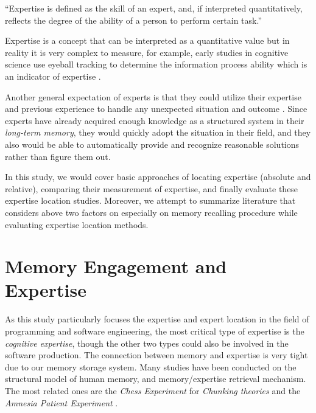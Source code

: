 \begin{displayquote}
``Expertise is defined as the skill of an expert, and, if interpreted quantitatively, reflects the degree of the ability of a person to perform certain task.''
\end{displayquote}

Expertise is a concept that can be interpreted as a quantitative value but in reality it is very complex to measure, for example, early studies in cognitive science use eyeball tracking to determine the information process ability which is an indicator of expertise \cite{gobet1996recall}.

Another general expectation of experts is that they could utilize their expertise and previous experience to handle any unexpected situation and outcome \cite{ericsson2006cambridge}. Since experts have already acquired enough knowledge as a structured system in their \textit{long-term memory}, they would quickly adopt the situation in their field, and they also would be able to automatically provide and recognize reasonable solutions rather than figure them out.

In this study, we would cover basic approaches of locating expertise (absolute and relative), comparing their measurement of expertise, and finally evaluate these expertise location studies. Moreover, we attempt to summarize literature that considers above two factors on especially on memory recalling procedure while evaluating expertise location methods.

\section{Memory Engagement and Expertise}

As this study particularly focuses the expertise and expert location in the field of programming and software engineering, the most critical type of expertise is the \textit{cognitive expertise}, though the other two types could also be involved in the software production. The connection between memory and expertise is very tight due to our memory storage system. Many studies have been conducted on the structural model of human memory, and memory/expertise retrieval mechanism. The most related ones are the \textit{Chess Experiment} for \textit{Chunking theories} \cite{chase1973perception, de2008thought, gobet1996recall} and the \textit{Amnesia Patient Experiment} \cite{cohen1980preserved}.

